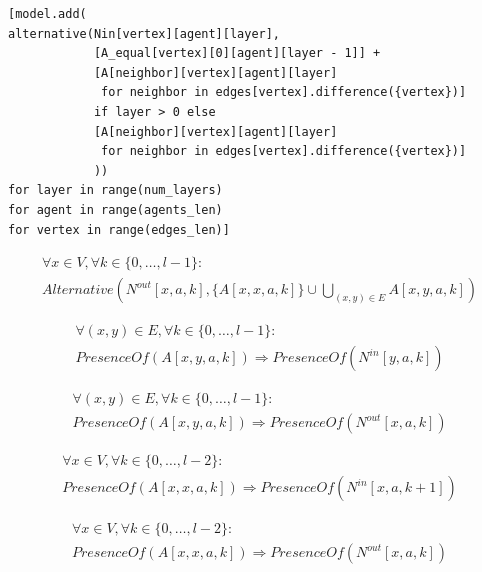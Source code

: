 \documentclass[12pt, a4paper, hidelinks]{article}
\numberwithin{equation}{section}
\begin{document}
\begin{lstlisting}[label={lst:eq2.7}]
[model.add(
alternative(Nin[vertex][agent][layer],
            [A_equal[vertex][0][agent][layer - 1]] +
            [A[neighbor][vertex][agent][layer]
             for neighbor in edges[vertex].difference({vertex})]
            if layer > 0 else
            [A[neighbor][vertex][agent][layer]
             for neighbor in edges[vertex].difference({vertex})]
            ))
for layer in range(num_layers)
for agent in range(agents_len)
for vertex in range(edges_len)]
\end{lstlisting}

\begin{description}\label{eq:equation_set_2.3}
\item \begin{equation}\begin{split} \forall x \in V, \forall k \in \{0,\dots,l-1\}: \\ Alternative(N^{out}[x,a,k], \{A[x,x,a,k]\} \cup \bigcup_{(x,y) \in E} A[x,y,a,k]) \end{split}\label{eq:2.8}\end{equation}
\item \begin{equation}\begin{split} \forall (x,y) \in E, \forall k \in \{0,\dots,l-1\}: \\ PresenceOf(A[x,y,a,k]) \Rightarrow PresenceOf(N^{in}[y,a,k]) \end{split}\label{eq:2.9}\end{equation}
\item \begin{equation}\begin{split} \forall (x,y) \in E, \forall k \in \{0,\dots,l-1\}: \\ PresenceOf(A[x,y,a,k]) \Rightarrow PresenceOf(N^{out}[x,a,k]) \end{split}\label{eq:2.10}\end{equation}
\item \begin{equation}\begin{split} \forall x \in V, \forall k \in \{0,\dots,l-2\}: \\ PresenceOf(A[x,x,a,k]) \Rightarrow PresenceOf(N^{in}[x,a,k+1]) \end{split}\label{eq:2.11}\end{equation}
\item \begin{equation}\begin{split} \forall x \in V, \forall k \in \{0,\dots,l-2\}: \\ PresenceOf(A[x,x,a,k]) \Rightarrow PresenceOf(N^{out}[x,a,k]) \end{split}\label{eq:2.12}\end{equation}

\end{description}
\end{document}
